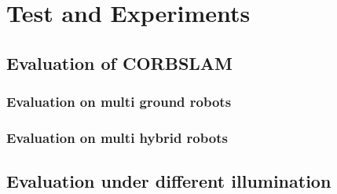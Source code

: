 
\chapter{Test and Experiments}

\section{Evaluation of CORBSLAM}
\subsection{Evaluation on multi ground robots}
\subsection{Evaluation on multi hybrid robots}

\section{Evaluation under different illumination}


\newpage
